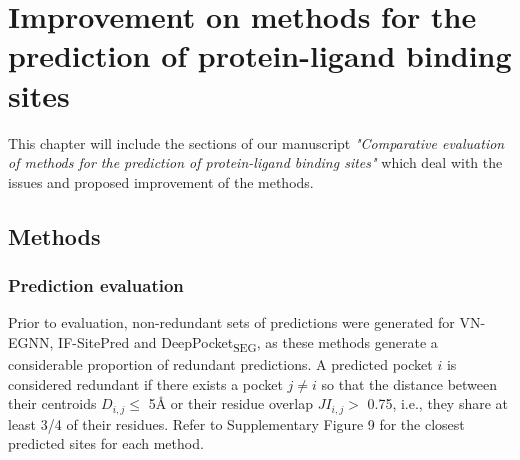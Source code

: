 \chapter{Improvement on methods for the prediction of protein-ligand binding sites}

This chapter will include the sections of our manuscript \textit{"Comparative evaluation of methods for the prediction of protein-ligand binding sites"} which deal with the issues and proposed improvement of the methods.

\section{Methods}

\subsection{Prediction evaluation}

Prior to evaluation, non-redundant sets of predictions were generated for VN-EGNN, IF-SitePred and DeepPocket\textsubscript{SEG}, as these methods generate a considerable proportion of redundant predictions. A predicted pocket $i$ is considered redundant if there exists a pocket $j \neq i$ so that the distance between their centroids $D_{i,j} \leq$ 5\AA{} or their residue overlap $JI_{i,j} >$ 0.75, i.e., they share at least 3/4 of their residues. Refer to Supplementary Figure 9 for the closest predicted sites for each method.

